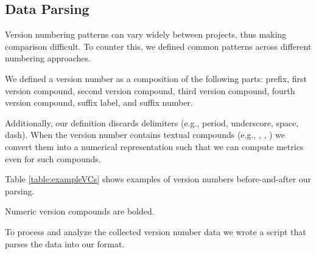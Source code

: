 \documentclass[conference]{IEEEtran}
\begin{document}
\subsection{Data Parsing}

 Version numbering patterns can vary widely between projects, thus making comparison difficult. 
To counter this, we defined common patterns across different numbering approaches. 

We defined a version number as a composition of the following parts: 
prefix, first version compound, second
 version compound, third version compound, fourth version compound, suffix label, and suffix number. 

Additionally, our definition discards delimiters (e.g., period, underscore, space, dash). When the version number contains textual compounds (e.g., , , ) we convert them into a numerical representation such that we can compute metrics even for such compounds. 

Table \ref{table:exampleVCs} shows examples of version numbers before-and-after 
our parsing.
 
 \begin{table*}[htb]
 \begin{center}
 \begin{adjustbox}{width=\textwidth}

\end{adjustbox}
\end{center}
\caption{Numeric version compounds are bolded. }
\label{table:exampleVCs}
\end{table*}
 
 
 
 To process and analyze the collected version number data we wrote a script that parses the data into our format. 






\end{document}
